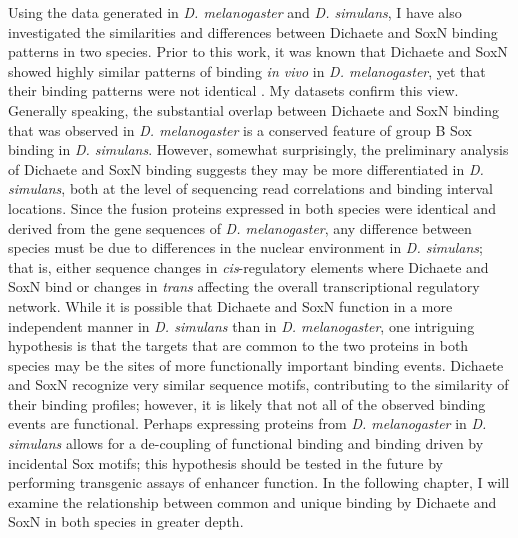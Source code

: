 Using the data generated in \emph{D. melanogaster} and \emph{D. simulans}, I have also investigated the similarities and differences between Dichaete and SoxN binding patterns in two species. Prior to this work, it was known that Dichaete and SoxN showed highly similar patterns of binding \emph{in vivo} in \emph{D. melanogaster}, yet that their binding patterns were not identical \citep{ferrero_soxneuro_2014}. My datasets confirm this view. Generally speaking, the substantial overlap between Dichaete and SoxN binding that was observed in \emph{D. melanogaster} is a conserved feature of group B Sox binding in \emph{D. simulans}. However, somewhat surprisingly, the preliminary analysis of Dichaete and SoxN binding suggests they may be more differentiated in \emph{D. simulans}, both at the level of sequencing read correlations and binding interval locations. Since the fusion proteins expressed in both species were identical and derived from the gene sequences of \emph{D. melanogaster}, any difference between species must be due to differences in the nuclear environment in \emph{D. simulans}; that is, either sequence changes in \emph{cis}-regulatory elements where Dichaete and SoxN bind or changes in \emph{trans} affecting the overall transcriptional regulatory network. While it is possible that Dichaete and SoxN function in a more independent manner in \emph{D. simulans} than in \emph{D. melanogaster}, one intriguing hypothesis is that the targets that are common to the two proteins in both species may be the sites of more functionally important binding events. Dichaete and SoxN recognize very similar sequence motifs, contributing to the similarity of their binding profiles; however, it is likely that not all of the observed binding events are functional. Perhaps expressing proteins from \emph{D. melanogaster} in \emph{D. simulans} allows for a de-coupling of functional binding and binding driven by incidental Sox motifs; this hypothesis should be tested in the future by performing transgenic assays of enhancer function. In the following chapter, I will examine the relationship between common and unique binding by Dichaete and SoxN in both species in greater depth.\\

